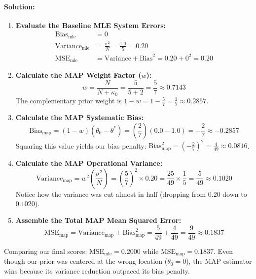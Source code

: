 \documentclass{article}
\begin{document}
\paragraph{Solution:}
\begin{enumerate}
    \item \textbf{Evaluate the Baseline MLE System Errors:}
    \begin{align}
    \text{Bias}_{\text{mle}} &= 0 \\
    \text{Variance}_{\text{mle}} &= \frac{\sigma^2}{N} = \frac{1.0}{5} = 0.20 \\
    \text{MSE}_{\text{mle}} &= \text{Variance} + \text{Bias}^2 = 0.20 + 0^2 = \mathbf{0.20}
    \end{align}
    
    \item \textbf{Calculate the MAP Weight Factor ($w$):}
    \begin{equation}
    w = \frac{N}{N + \kappa_0} = \frac{5}{5 + 2} = \frac{5}{7} \approx 0.7143
    \end{equation}
    The complementary prior weight is $1 - w = 1 - \frac{5}{7} = \frac{2}{7} \approx 0.2857$.
    
    \item \textbf{Calculate the MAP Systematic Bias:}
    \begin{equation}
    \text{Bias}_{\text{map}} = (1 - w)(\theta_0 - \theta^*) = \left(\frac{2}{7}\right)(0.0 - 1.0) = -\frac{2}{7} \approx -0.2857
    \end{equation}
    Squaring this value yields our bias penalty: $\text{Bias}^2_{\text{map}} = \left(-\frac{2}{7}\right)^2 = \frac{4}{49} \approx 0.0816$.
    
    \item \textbf{Calculate the MAP Operational Variance:}
    \begin{equation}
    \text{Variance}_{\text{map}} = w^2 \left(\frac{\sigma^2}{N}\right) = \left(\frac{5}{7}\right)^2 \times 0.20 = \frac{25}{49} \times \frac{1}{5} = \frac{5}{49} \approx 0.1020
    \end{equation}
    Notice how the variance was cut almost in half (dropping from $0.20$ down to $0.1020$).
    
    \item \textbf{Assemble the Total MAP Mean Squared Error:}
    \begin{equation}
    \text{MSE}_{\text{map}} = \text{Variance}_{\text{map}} + \text{Bias}^2_{\text{map}} = \frac{5}{49} + \frac{4}{49} = \frac{9}{49} \approx \mathbf{0.1837}
    \end{equation}
\end{enumerate}
Comparing our final scores: $\text{MSE}_{\text{mle}} = 0.2000$ while $\text{MSE}_{\text{map}} = 0.1837$. Even though our prior was centered at the wrong location ($\theta_0 = 0$), the MAP estimator wins because its variance reduction outpaced its bias penalty.
\end{document}
